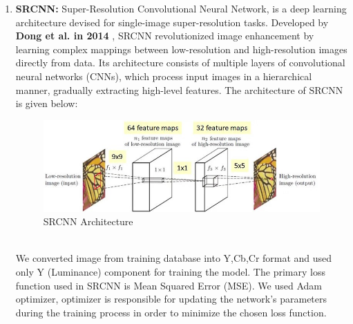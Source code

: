 \begin{enumerate}
    \item {\bf SRCNN:} Super-Resolution Convolutional Neural Network, is a deep learning architecture devised for single-image super-resolution tasks. Developed by {\bf Dong et al. in 2014} \cite{r4}, SRCNN revolutionized image enhancement by learning complex mappings between low-resolution and high-resolution images directly from data. Its architecture consists of multiple layers of convolutional neural networks (CNNs), which process input images in a hierarchical manner, gradually extracting high-level features. The architecture of SRCNN is given below:
    \begin{figure}[ht]
        \centering
        \includegraphics[width=5in]{./figures/srcnn.jpg}
        \caption{SRCNN Architecture}
    \end{figure} \\
    We converted image from training database into Y,Cb,Cr format and used only Y (Luminance) component for training the model. The primary loss function used in SRCNN is Mean Squared Error (MSE). We used Adam optimizer, optimizer is responsible for updating the network's parameters during the training process in order to minimize the chosen loss function.


\end{enumerate}
